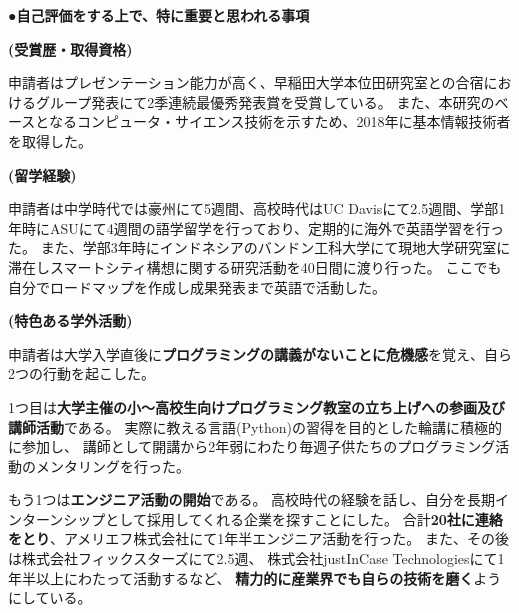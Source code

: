 {\noindent
●\textbf{自己評価をする上で、特に重要と思われる事項}

\textbf{(受賞歴・取得資格)}

申請者はプレゼンテーション能力が高く、早稲田大学本位田研究室との合宿におけるグループ発表にて2季連続最優秀発表賞を受賞している。
また、本研究のベースとなるコンピュータ・サイエンス技術を示すため、2018年に基本情報技術者を取得した。

\textbf{(留学経験)}

申請者は中学時代では豪州にて5週間、高校時代はUC Davisにて2.5週間、学部1年時にASUにて4週間の語学留学を行っており、定期的に海外で英語学習を行った。
また、学部3年時にインドネシアのバンドン工科大学にて現地大学研究室に滞在しスマートシティ構想に関する研究活動を40日間に渡り行った。
ここでも自分でロードマップを作成し成果発表まで英語で活動した。

\textbf{(特色ある学外活動)}

申請者は大学入学直後に\textbf{プログラミングの講義がないことに危機感}を覚え、自ら2つの行動を起こした。

1つ目は\textbf{大学主催の小〜高校生向けプログラミング教室の立ち上げへの参画及び講師活動}である。
実際に教える言語(Python)の習得を目的とした輪講に積極的に参加し、
講師として開講から2年弱にわたり毎週子供たちのプログラミング活動のメンタリングを行った。

もう1つは\textbf{エンジニア活動の開始}である。
高校時代の経験を話し、自分を長期インターンシップとして採用してくれる企業を探すことにした。
合計\textbf{20社に連絡をとり}、アメリエフ株式会社にて1年半エンジニア活動を行った。
また、その後は株式会社フィックスターズにて2.5週、
株式会社justInCase Technologiesにて1年半以上にわたって活動するなど、
\textbf{精力的に産業界でも自らの技術を磨く}ようにしている。

}

